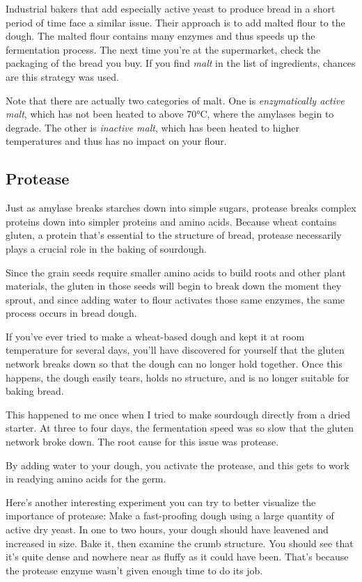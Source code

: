 Industrial bakers that add especially active yeast to produce bread in a short
period of time face a similar issue. Their approach is to add malted flour to
the dough. The malted flour contains many enzymes and thus speeds up the
fermentation process. The next time you're at the supermarket, check the
packaging of the bread you buy. If you find {\it malt} in the list of
ingredients, chances are this strategy was used.

Note that there are actually two categories of malt. One is {\it enzymatically
active malt}, which has not been heated to above 70°C, where the amylases begin
to degrade. The other is {\it inactive malt}, which has been heated to higher
temperatures and thus has no impact on your flour.

\subsection{Protease}

Just as amylase breaks starches down into simple sugars, protease breaks
complex proteins down into simpler proteins and amino acids. Because wheat
contains gluten, a protein that's essential to the structure of bread,
protease necessarily plays a crucial role in the baking of sourdough.

Since the grain seeds require smaller amino acids to build roots and other
plant materials, the gluten in those seeds will begin to break down the moment
they sprout, and since adding water to flour activates those same enzymes,
the same process occurs in bread dough.

If you've ever tried to make a wheat-based dough and kept it at room
temperature for several days, you'll have discovered for yourself that the
gluten network breaks down so that the dough can no longer hold together. Once
this happens, the dough easily tears, holds no structure, and is no
longer suitable for baking bread.

This happened to me once when I tried to make sourdough directly from a dried
starter. At three to four days, the fermentation speed was so slow that the
gluten network broke down. The root cause for this issue was protease.

By adding water to your dough, you activate the protease, and this gets to work
in readying amino acids for the germ.

Here's another interesting experiment you can try to better visualize the
importance of protease: Make a fast-proofing dough using a large quantity
of active dry yeast. In one to two hours, your dough should have leavened and
increased in size. Bake it, then examine the crumb structure. You should see
that it's quite dense and nowhere near as fluffy as it could have been. That's
because the protease enzyme wasn't given enough time to do its job.

